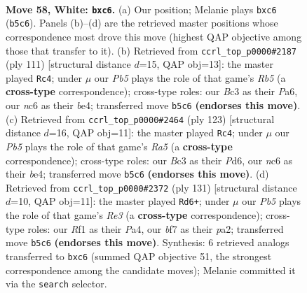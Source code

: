 \documentclass[11pt]{article}
\begin{document}
\clearpage

\begin{figure}[p]\centering
\begin{subfigure}{0.46\textwidth}\centering
\resizebox{\linewidth}{!}{%
\newchessgame
\chessboard[
  setfen={2k5/5b2/2n5/1P6/8/2Br4/7K/5R2 w - - 0 58},
  showmover=false,
  pgfstyle=straightmove, color=movearrow, markmove={b5-c6}
]}
\caption{}
\end{subfigure}\hfill
\begin{subfigure}{0.46\textwidth}\centering
\resizebox{\linewidth}{!}{%
\newchessgame
\chessboard[
  setfen={4k3/R7/p7/8/1r2B3/4K3/8/8 b - - 6 56},
  showmover=false,
  pgfstyle=straightmove, color=movearrow, markmove={b4-c4}
]}
\caption{}
\end{subfigure}
\\[4pt]
\begin{subfigure}{0.46\textwidth}\centering
\resizebox{\linewidth}{!}{%
\newchessgame
\chessboard[
  setfen={7k/3R4/3p4/8/r3B3/4K3/8/8 b - - 11 62},
  showmover=false,
  pgfstyle=straightmove, color=movearrow, markmove={a4-c4}
]}
\caption{}
\end{subfigure}\hfill
\begin{subfigure}{0.46\textwidth}\centering
\resizebox{\linewidth}{!}{%
\newchessgame
\chessboard[
  setfen={8/8/4r3/7k/pb3R2/3KN3/P7/8 b - - 3 66},
  showmover=false,
  pgfstyle=straightmove, color=movearrow, markmove={e6-d6}
]}
\caption{}
\end{subfigure}
\caption{\textbf{Move 58, White: \texttt{bxc6}.} (a) Our position; Melanie plays \texttt{bxc6} (\texttt{b5c6}). Panels (b)--(d) are the retrieved master positions whose correspondence most drove this move (highest QAP objective among those that transfer to it). (b) Retrieved from \texttt{ccrl\_top\_p0000\#2187} (ply 111) [structural distance $d$=15, QAP obj=13]: the master played \texttt{Rc4}; under $\mu$ our \emph{Pb5} plays the role of that game's \emph{Rb5} (a \textbf{cross-type} correspondence); cross-type roles: our \emph{B}c3 as their \emph{P}a6, our \emph{n}c6 as their \emph{b}e4; transferred move \texttt{b5c6} \textbf{(endorses this move)}. (c) Retrieved from \texttt{ccrl\_top\_p0000\#2464} (ply 123) [structural distance $d$=16, QAP obj=11]: the master played \texttt{Rc4}; under $\mu$ our \emph{Pb5} plays the role of that game's \emph{Ra5} (a \textbf{cross-type} correspondence); cross-type roles: our \emph{B}c3 as their \emph{P}d6, our \emph{n}c6 as their \emph{b}e4; transferred move \texttt{b5c6} \textbf{(endorses this move)}. (d) Retrieved from \texttt{ccrl\_top\_p0000\#2372} (ply 131) [structural distance $d$=10, QAP obj=11]: the master played \texttt{Rd6+}; under $\mu$ our \emph{Pb5} plays the role of that game's \emph{Re3} (a \textbf{cross-type} correspondence); cross-type roles: our \emph{R}f1 as their \emph{P}a4, our \emph{b}f7 as their \emph{p}a2; transferred move \texttt{b5c6} \textbf{(endorses this move)}. Synthesis: 6 retrieved analogs transferred to \texttt{bxc6} (summed QAP objective 51, the strongest correspondence among the candidate moves); Melanie committed it via the \texttt{search} selector.}
\label{fig:thought-m114}
\end{figure}
\end{document}
